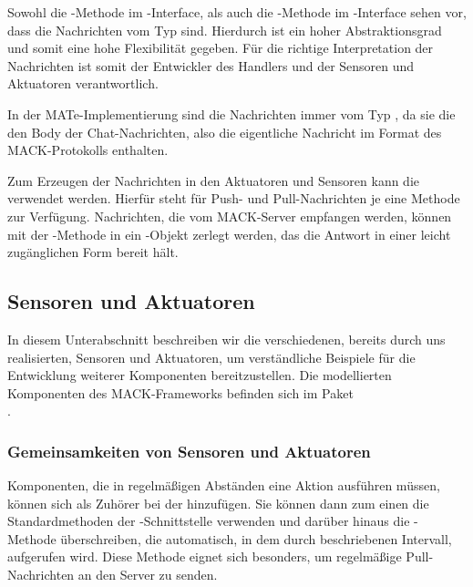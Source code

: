 Sowohl die -Methode im -Interface, als auch die -Methode im -Interface sehen vor, dass die Nachrichten vom Typ  sind. Hierdurch ist ein hoher Abstraktionsgrad und somit eine hohe Flexibilität gegeben. Für die richtige Interpretation der Nachrichten ist somit der Entwickler des Handlers und der Sensoren und Aktuatoren verantwortlich.

In der MATe-Implementierung sind die Nachrichten immer vom Typ , da sie die den Body der Chat-Nachrichten, also die eigentliche Nachricht im Format des MACK-Protokolls enthalten.

Zum Erzeugen der Nachrichten in den Aktuatoren und Sensoren kann die  verwendet werden. Hierfür steht für Push- und Pull-Nachrichten je eine Methode zur Verfügung. Nachrichten, die vom MACK-Server empfangen werden, können mit der -Methode in ein -Objekt zerlegt werden, das die Antwort in einer leicht zugänglichen Form bereit hält.

\subsection{Sensoren und Aktuatoren}\label{subsec:real_sensors}
In diesem Unterabschnitt beschreiben wir die verschiedenen, bereits durch uns realisierten, Sensoren und Aktuatoren, um verständliche Beispiele für die Entwicklung weiterer Komponenten bereitzustellen. Die modellierten Komponenten des MACK-Frameworks befinden sich im Paket \\.

\subsubsection{Gemeinsamkeiten von Sensoren und Aktuatoren}
Komponenten, die in regelmäßigen Abständen eine Aktion ausführen müssen, können sich als Zuhörer bei der  hinzufügen. Sie können dann zum einen die Standardmethoden der -Schnittstelle verwenden und darüber hinaus die  -Methode überschreiben, die automatisch, in dem durch  beschriebenen Intervall, aufgerufen wird. Diese Methode eignet sich besonders, um regelmäßige Pull-Nachrichten an den Server zu senden.

